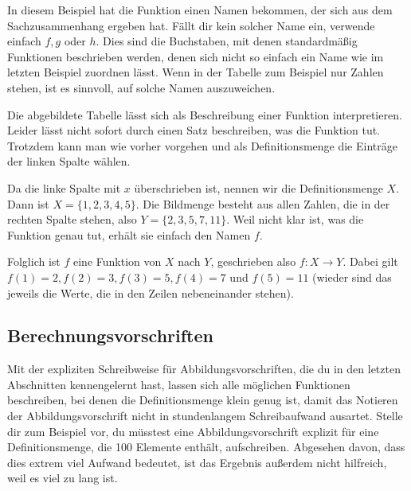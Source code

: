 \documentclass[../../main.tex]{subfiles}
\begin{document}
In diesem Beispiel hat die Funktion einen Namen bekommen, der sich aus dem Sachzusammenhang ergeben hat. Fällt dir kein solcher Name ein, verwende einfach $f, g$ oder $h$. Dies sind die Buchstaben, mit denen standardmäßig Funktionen beschrieben werden, denen sich nicht so einfach ein Name wie im letzten Beispiel zuordnen lässt. Wenn in der Tabelle zum Beispiel nur Zahlen stehen, ist es sinnvoll, auf solche Namen auszuweichen.

\begin{example}{}
    
    Die abgebildete Tabelle lässt sich als Beschreibung einer Funktion interpretieren. Leider lässt nicht sofort durch einen Satz beschreiben, was die Funktion tut. Trotzdem kann man wie vorher vorgehen und als Definitionsmenge die Einträge der linken Spalte wählen.
    
    Da die linke Spalte mit $x$ überschrieben ist, nennen wir die Definitionsmenge $X$. Dann ist $X=\{1,2,3,4,5\}$. Die Bildmenge besteht aus allen Zahlen, die in der rechten Spalte stehen, also $Y=\{2,3,5,7,11\}$. Weil nicht klar ist, was die Funktion genau tut, erhält sie einfach den Namen $f$.
    
    Folglich ist $f$ eine Funktion von $X$ nach $Y$, geschrieben also $f\colon X\rightarrow Y$. Dabei gilt $f(1)=2, f(2)=3, f(3)=5, f(4)=7$ und $f(5)=11$ (wieder sind das jeweils die Werte, die in den Zeilen nebeneinander stehen).
\end{example}

\subsection{Berechnungsvorschriften}
\label{sec:abbildungen_berechnungsvorschriften}

Mit der expliziten Schreibweise für Abbildungsvorschriften, die du in den letzten Abschnitten kennengelernt hast, lassen sich alle möglichen Funktionen beschreiben, bei denen die Definitionsmenge klein genug ist, damit das Notieren der Abbildungsvorschrift nicht in stundenlangem Schreibaufwand ausartet. Stelle dir zum Beispiel vor, du müsstest eine Abbildungsvorschrift explizit für eine Definitionsmenge, die 100 Elemente enthält, aufschreiben. Abgesehen davon, dass dies extrem viel Aufwand bedeutet, ist das Ergebnis außerdem nicht hilfreich, weil es viel zu lang ist.
\end{document}
